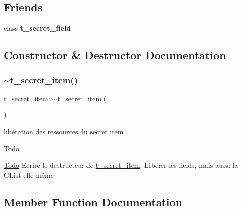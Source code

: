 \subsection*{Friends}
\begin{DoxyCompactItemize}
\item 
\mbox{\label{classt__secret__item_aeb664f947e2d8464088eb008d64a775f}} 
class {\bfseries t\+\_\+secret\+\_\+field}
\end{DoxyCompactItemize}


\subsection{Constructor \& Destructor Documentation}
\mbox{\label{classt__secret__item_a69e1fb6f4157b29853aea12ea289a435}} 
\subsubsection{\texorpdfstring{$\sim$t\+\_\+secret\+\_\+item()}{~t\_secret\_item()}}
{\footnotesize\ttfamily t\+\_\+secret\+\_\+item\+::$\sim$t\+\_\+secret\+\_\+item (\begin{DoxyParamCaption}{ }\end{DoxyParamCaption})}



libération des ressources du secret item 

\begin{DoxyRefDesc}{Todo}
\item[\hyperlink{todo__todo000011}{Todo}]Ecrire le destructeur de \hyperlink{classt__secret__item}{t\+\_\+secret\+\_\+item}. L\+Ibérer les fields, mais aussi la G\+List elle-\/même \end{DoxyRefDesc}


\subsection{Member Function Documentation}
\mbox{\label{classt__secret__item_a39ecb24957d5ca0156194e38860c5250}} 
